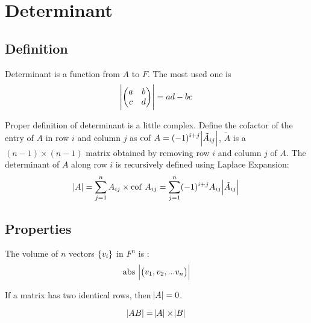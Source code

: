 \section{Determinant}


\subsection{Definition}

Determinant is a function from $A$ to $F$. The most used one is 
\begin{equation}
    \abs{\begin{pmatrix}
        a & b \\
        c & d
    \end{pmatrix}} = ad - bc
\end{equation}


Proper definition of determinant is a little complex. Define the cofactor of the entry of $A$ in row $i$ and column $j$ as $\displaystyle \mathrm{cof}~\displaystyle A = (-1)^{i+j} \abs{\tilde{A}_{ij}}$, $\tilde{A}$ is a $(n-1)\times (n-1)$ matrix obtained by removing row $i$ and column $j$ of $A$. The determinant of $A$ along row $i$ is recursively defined using Laplace Expansion:
\begin{equation}
    \abs{A} = \sum_{j=1}^n A_{ij} \times \displaystyle \mathrm{cof}~\displaystyle A_{ij} = \sum_{j=1}^n (-1)^{i+j} A_{ij}  \abs{\tilde{A}_{ij}}
\end{equation}


\subsection{Properties}

\begin{theorem}
    The volume of $n$ vectors $\set{v_i}$ in $F^n$ is :
    \begin{equation}
      \mathrm{abs}~\abs{\begin{pmatrix}
            v_1, v_2, ... v_n
        \end{pmatrix}}
    \end{equation}
\end{theorem}


\begin{theorem}
    If a matrix has two identical rows, then $\abs{A} = 0$.
\end{theorem}


\begin{theorem}
    \begin{equation}
        \abs{AB} = \abs{A} \times \abs{B}
    \end{equation}    
\end{theorem}


